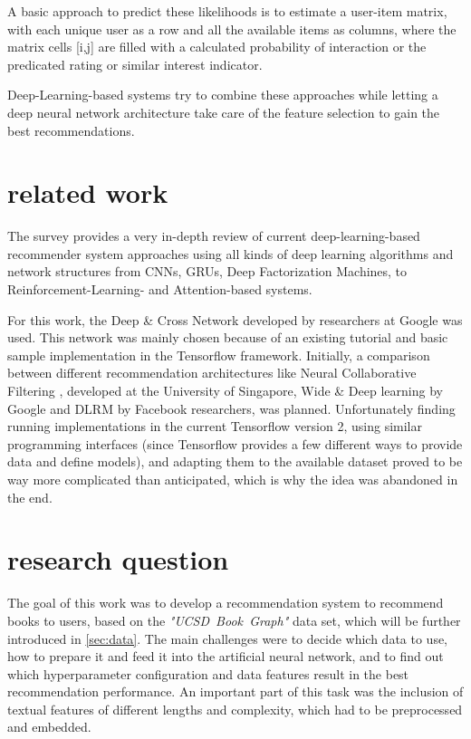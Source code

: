 \documentclass[10pt,final,journal,a4paper,oneside,twocolumn]{IEEEtran}
\begin{document}

A basic approach to predict these likelihoods is to estimate a user-item matrix, with each unique user as a row and all the available items as columns, where the matrix cells [i,j] are filled with a calculated probability of interaction or the predicated rating or similar interest indicator. 

Deep-Learning-based systems try to combine these approaches while letting a deep neural network architecture take care of the feature selection to gain the best recommendations.

\section{related work}
The survey \cite{Zhang.2020} provides a very in-depth review of current deep-learning-based recommender system approaches using all kinds of deep learning algorithms and network structures from CNNs, GRUs, Deep Factorization Machines, to Reinforcement-Learning- and Attention-based systems.

For this work, the Deep \& Cross Network \cite{Wang.2017} \cite{Wang.2021} developed by researchers at Google was used. This network was mainly chosen because of an existing tutorial and basic sample implementation in the Tensorflow framework.
Initially, a comparison between different recommendation architectures like Neural Collaborative Filtering \cite{He.2017}, developed at the University of Singapore, Wide \& Deep learning \cite{Cheng.2016} by Google and DLRM \cite{Naumov.31.05.2019} by Facebook researchers, was planned. Unfortunately finding running implementations in the current Tensorflow version 2, using similar programming interfaces (since Tensorflow provides a few different ways to provide data and define models), and adapting them to the available dataset proved to be way more complicated than anticipated, which is why the idea was abandoned in the end.


\section{research question}
The goal of this work was to develop a recommendation system to recommend books to users, based on the \emph{"UCSD~Book~Graph"} data set, which will be further introduced in \autoref{sec:data}. The main challenges were to decide which data to use, how to prepare it and feed it into the artificial neural network, and to find out which hyperparameter configuration and data features result in the best recommendation performance.
An important part of this task was the inclusion of textual features of different lengths and complexity, which had to be preprocessed and embedded.
\end{document}

